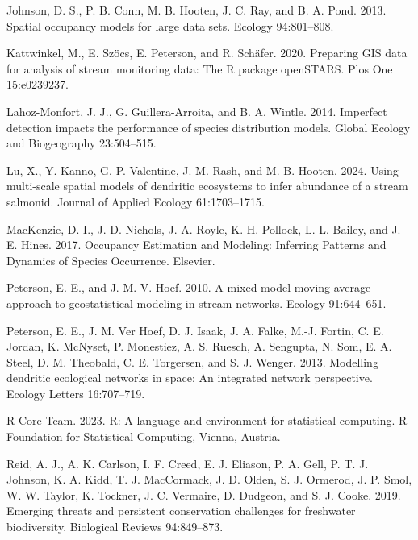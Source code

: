 \documentclass[
  11pt,
  a4paper,
]{article}
\newlength{\cslhangindent}
\newenvironment{CSLReferences}[2] %
 {\begin{list}{}{%
  \setlength{\itemindent}{0pt}
  \setlength{\leftmargin}{0pt}
  \setlength{\parsep}{0pt}
  \ifodd #1
   \setlength{\leftmargin}{\cslhangindent}
   \setlength{\itemindent}{-1\cslhangindent}
  \fi
  \setlength{\itemsep}{#2\baselineskip}}}
 {\end{list}}
\begin{document}
\begin{CSLReferences}{1}{0}
Johnson, D. S., P. B. Conn, M. B. Hooten, J. C. Ray, and B. A. Pond. 2013. Spatial occupancy models for large data sets. Ecology 94:801--808.

Kattwinkel, M., E. Szöcs, E. Peterson, and R. Schäfer. 2020. Preparing GIS data for analysis of stream monitoring data: The {R} package openSTARS. Plos One 15:e0239237.

Lahoz-Monfort, J. J., G. Guillera-Arroita, and B. A. Wintle. 2014. Imperfect detection impacts the performance of species distribution models. Global Ecology and Biogeography 23:504--515.

Lu, X., Y. Kanno, G. P. Valentine, J. M. Rash, and M. B. Hooten. 2024. Using multi-scale spatial models of dendritic ecosystems to infer abundance of a stream salmonid. Journal of Applied Ecology 61:1703--1715.

MacKenzie, D. I., J. D. Nichols, J. A. Royle, K. H. Pollock, L. L. Bailey, and J. E. Hines. 2017. Occupancy {Estimation} and {Modeling}: {Inferring Patterns} and {Dynamics} of {Species Occurrence}. {Elsevier}.

Peterson, E. E., and J. M. V. Hoef. 2010. A mixed-model moving-average approach to geostatistical modeling in stream networks. Ecology 91:644--651.

Peterson, E. E., J. M. Ver Hoef, D. J. Isaak, J. A. Falke, M.-J. Fortin, C. E. Jordan, K. McNyset, P. Monestiez, A. S. Ruesch, A. Sengupta, N. Som, E. A. Steel, D. M. Theobald, C. E. Torgersen, and S. J. Wenger. 2013. Modelling dendritic ecological networks in space: An integrated network perspective. Ecology Letters 16:707--719.

R Core Team. 2023. \href{https://www.R-project.org/}{R: A language and environment for statistical computing}. R Foundation for Statistical Computing, Vienna, Austria.

Reid, A. J., A. K. Carlson, I. F. Creed, E. J. Eliason, P. A. Gell, P. T. J. Johnson, K. A. Kidd, T. J. MacCormack, J. D. Olden, S. J. Ormerod, J. P. Smol, W. W. Taylor, K. Tockner, J. C. Vermaire, D. Dudgeon, and S. J. Cooke. 2019. Emerging threats and persistent conservation challenges for freshwater biodiversity. Biological Reviews 94:849--873.


\end{CSLReferences}
\end{document}
